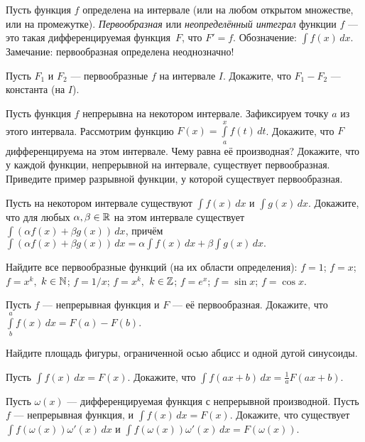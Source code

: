 \documentclass[a4paper, 11pt]{article}
\newcommand{\0}[1]{\overline{#1}}
\begin{document}



 Пусть функция $f$ определена на интервале (или на любом открытом множестве, или на промежутке). {\em Первообразная} или {\em неопределённый интеграл} функции $f$ --- это такая дифференцируемая функция~$F$, что $F'=f$.
Обозначение: $\int f(x)\, dx$. Замечание: первообразная определена неоднозначно!


Пусть $F_1$ и $F_2$ --- первообразные $f$ на интервале $I$. Докажите, что %
$F_1-F_2$ --- константа (на $I$).


 Пусть функция $f$ непрерывна на некотором интервале. Зафиксируем точку
$a$ из этого интервала. Рассмотрим функцию $F(x)=\int\limits_a^xf(t)\, dt$.
Докажите, что $F$ дифференцируема на этом интервале. Чему равна е\"е производная?
 Докажите, что у каждой функции, непрерывной на интервале, существует первообразная.
 Приведите пример разрывной функции, у которой существует первообразная.

Пусть на некотором интервале существуют  $\int f(x)\, dx$
и $\int g(x)\, dx$. Докажите, что для любых $\alpha, \beta\in\mathbb{R}$
на этом интервале существует
 $\int (\alpha f(x)+\beta g(x))\, dx$, причём
$\int (\alpha f(x)+\beta g(x))\, dx=\alpha \int f(x)\, dx +\beta \int g(x)\, dx.$

 Найдите все первообразные функций (на их области определения):
 $f=1$;
 $f=x$;
 $f=x^k,$ $k\in \mathbb{N}$;
 $f=1/x$;
 $f=x^k,$ $k\in \mathbb{Z}$;
 $f=e^x$;
 $f=\sin x $;
 $f=\cos x $.

Пусть $f$ --- непрерывная функция и $F$ --- е\"е первообразная. Докажите,
что $\int\limits_b^af(x)\, dx=F(a)-F(b)$.

Найдите площадь фигуры, ограниченной осью абцисс и одной дугой синусоиды.


Пусть $\int f(x)\, dx=F(x)$.
Докажите, что $\int f(ax+b)\, dx =\frac{1}{a}F(ax+b)$.

Пусть $\omega (x)$ --- дифференцируемая функция с непрерывной производной.
Пусть $f$ --- непрерывная функция, и $\int f(x)\, dx=F(x)$.
Докажите, что существует $\int f(\omega (x))\omega '(x)\, dx$ и
$\int f(\omega (x))\omega '(x)\, dx=F(\omega (x)).$
\end{document}
